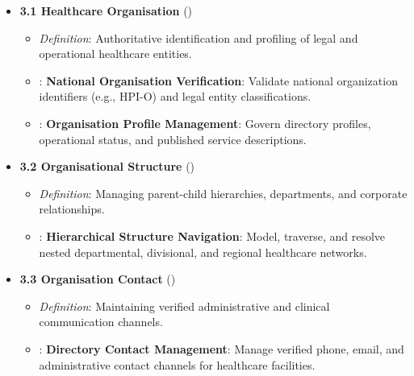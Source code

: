 \begin{itemize}

\item
\textbf{3.1 Healthcare Organisation} (\texttt{})


\begin{itemize}

\item
\emph{Definition}: Authoritative identification and profiling of legal and operational healthcare entities.



\item
\texttt{}: \textbf{National Organisation Verification}: Validate national organization identifiers (e.g., HPI-O) and legal entity classifications.



\item
\texttt{}: \textbf{Organisation Profile Management}: Govern directory profiles, operational status, and published service descriptions.



\end{itemize}


\item
\textbf{3.2 Organisational Structure} (\texttt{})


\begin{itemize}

\item
\emph{Definition}: Managing parent-child hierarchies, departments, and corporate relationships.



\item
\texttt{}: \textbf{Hierarchical Structure Navigation}: Model, traverse, and resolve nested departmental, divisional, and regional healthcare networks.



\end{itemize}


\item
\textbf{3.3 Organisation Contact} (\texttt{})


\begin{itemize}

\item
\emph{Definition}: Maintaining verified administrative and clinical communication channels.



\item
\texttt{}: \textbf{Directory Contact Management}: Manage verified phone, email, and administrative contact channels for healthcare facilities.



\end{itemize}


\end{itemize}
\label{rad:enabling:174}
